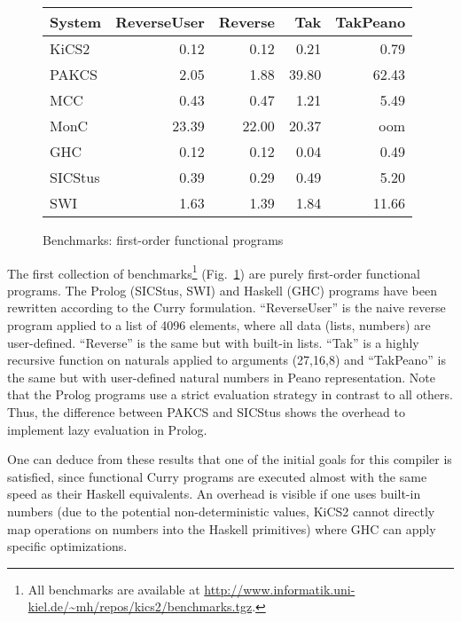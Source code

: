 \documentclass{llncs}
\begin{document}
\begin{figure}
\centering
\begin{tabular}{|@{~~}l@{~~}|*{4}{@{~~}r@{~~}|}}
\hline
System  & ReverseUser & Reverse &  Tak  & TakPeano \\\hline
KiCS2   &      0.12   &   0.12  &  0.21 &    0.79  \\
PAKCS   &      2.05   &   1.88  & 39.80 &   62.43  \\
MCC     &      0.43   &   0.47  &  1.21 &    5.49  \\
MonC    &     23.39   &  22.00  & 20.37 &     oom  \\
GHC     &      0.12   &   0.12  &  0.04 &    0.49  \\
SICStus &      0.39   &   0.29  &  0.49 &    5.20  \\
SWI     &      1.63   &   1.39  &  1.84 &   11.66  \\
\hline
\end{tabular}
\caption{Benchmarks: first-order functional programs}
 \label{fig:bench-first-order}
\end{figure}
%
The first collection of benchmarks\footnote{All benchmarks are available
at \url{http://www.informatik.uni-kiel.de/~mh/repos/kics2/benchmarks.tgz}.}
(Fig.~\ref{fig:bench-first-order})
are purely first-order functional programs.
The Prolog (SICStus, SWI) and Haskell (GHC) programs have been rewritten
according to the Curry formulation.
``ReverseUser'' is the naive reverse program applied to a list of 4096 elements,
where all data (lists, numbers) are user-defined.
``Reverse'' is the same but with built-in lists.
``Tak'' is a highly recursive function on naturals \cite{Partain93}
applied to arguments (27,16,8) and ``TakPeano'' is the same but with
user-defined natural numbers in Peano representation.
Note that the Prolog programs use a strict evaluation strategy
in contrast to all others. Thus, the difference between PAKCS and SICStus
shows the overhead to implement lazy evaluation in Prolog.

One can deduce from these results that one of the initial
goals for this compiler is satisfied, since functional Curry programs
are executed almost with the same speed as their Haskell equivalents.
An overhead is visible if one uses built-in numbers
(due to the potential non-deterministic values, KiCS2 cannot
directly map operations on numbers into the Haskell primitives)
where GHC can apply specific optimizations.
\end{document}
